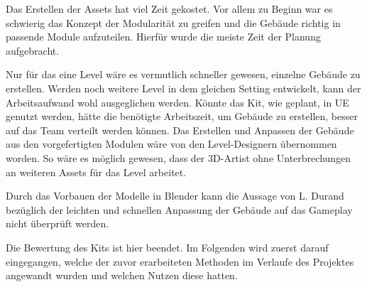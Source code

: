 Das Erstellen der Assets hat viel Zeit gekostet. Vor allem zu Beginn war es schwierig das Konzept der Modularität zu greifen und die Gebäude richtig in passende Module aufzuteilen. Hierfür wurde die meiste Zeit der Planung aufgebracht.
\par
Nur für das eine Level wäre es vermutlich schneller gewesen, einzelne Gebäude zu erstellen. Werden noch weitere Level in dem gleichen Setting entwickelt, kann der Arbeitsaufwand wohl ausgeglichen werden.
\newpage
Könnte das Kit, wie geplant, in UE genutzt werden, hätte die benötigte Arbeitszeit, um Gebäude zu erstellen, besser auf das Team verteilt werden können. Das Erstellen und Anpassen der Gebäude aus den vorgefertigten Modulen wäre von den Level-Designern übernommen worden. So wäre es möglich gewesen, dass der 3D-Artist ohne Unterbrechungen an weiteren Assets für das Level arbeitet.
\par
Durch das Vorbauen der Modelle in Blender kann die Aussage von L. Durand  bezüglich der leichten und schnellen Anpassung der Gebäude auf das Gameplay nicht überprüft werden.
\par
Die Bewertung des Kits ist hier beendet. Im Folgenden wird zuerst darauf eingegangen, welche der zuvor erarbeiteten Methoden im Verlaufe des Projektes angewandt wurden und welchen Nutzen diese hatten.

